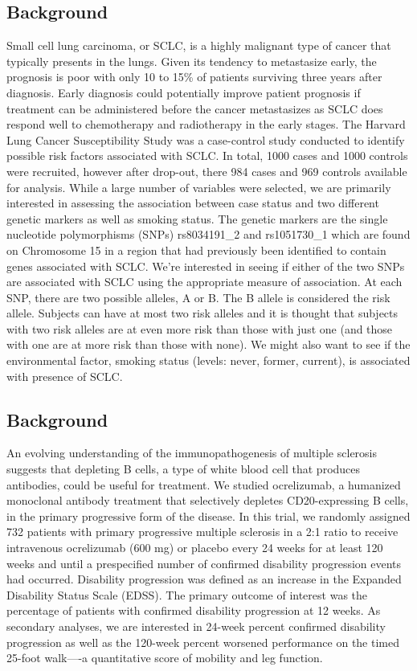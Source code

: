 \documentclass{article}
\begin{document}
\begin{enumerate}
		\subsection*{Background} Small cell lung carcinoma, or SCLC, is a highly malignant type of cancer that typically presents in the lungs. Given its tendency to metastasize early, the prognosis is poor with only 10 to 15\% of patients surviving three years after diagnosis. Early diagnosis could potentially improve patient prognosis if treatment can be administered before the cancer metastasizes as SCLC does respond well to chemotherapy and radiotherapy in the early stages. The Harvard Lung Cancer Susceptibility Study was a case-control study conducted to identify possible risk factors associated with SCLC. In total, 1000 cases and 1000 controls were recruited, however after drop-out, there 984 cases and 969 controls available for analysis. While a large number of variables were selected, we are primarily interested in assessing the association between case status and two different genetic markers as well as smoking status. The genetic markers are the single nucleotide polymorphisms (SNPs) rs8034191\_2 and rs1051730\_1 which are found on Chromosome 15 in a region that had previously been identified to contain genes associated with SCLC. We're interested in seeing if either of the two SNPs are associated with SCLC using the appropriate measure of association. At each SNP, there are two possible alleles, A or B. The B allele is considered the risk allele. Subjects can have at most two risk alleles and it is thought that subjects with two risk alleles are at even more risk than those with just one (and those with one are at more risk than those with none). We might also want to see if the environmental factor, smoking status (levels: never, former, current), is associated with presence of SCLC.
	\end{enumerate}


	\newpage
	\subsection*{Background}
		
		An evolving understanding of the immunopathogenesis of multiple sclerosis suggests that depleting B cells, a type of white blood cell that produces antibodies, could be useful for treatment. We studied ocrelizumab, a humanized monoclonal antibody treatment that selectively depletes CD20-expressing B cells, in the primary progressive form of the disease. In this trial, we randomly assigned 732 patients with primary progressive multiple sclerosis in a 2:1 ratio to receive intravenous ocrelizumab (600 mg) or placebo every 24 weeks for at least 120 weeks and until a prespecified number of confirmed disability progression events had occurred. Disability progression was defined as an increase in the Expanded Disability Status Scale (EDSS). The primary outcome of interest was the percentage of patients with confirmed disability progression at 12 weeks. As secondary analyses, we are interested in 24-week percent confirmed disability progression as well as the 120-week percent worsened performance on the timed 25-foot walk----a quantitative score of mobility and leg function.
\end{document}
